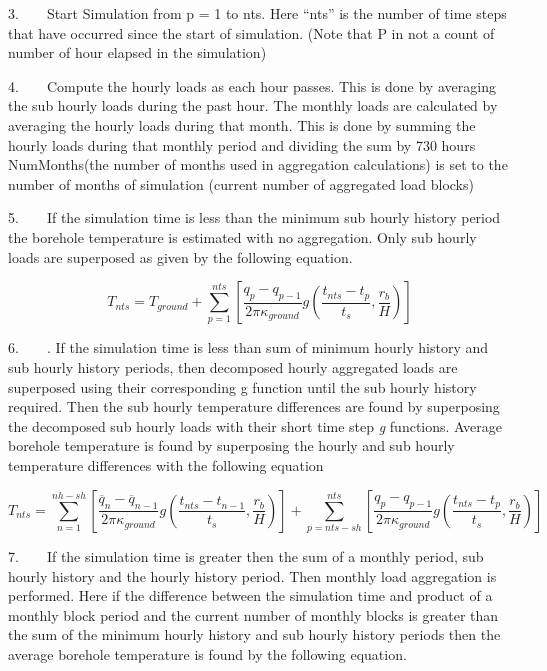 3.~~~~Start Simulation from p = 1 to nts. Here ``nts'' is the number of time steps that have occurred since the start of simulation. (Note that P in not a count of number of hour elapsed in the simulation)

4.~~~~Compute the hourly loads as each hour passes. This is done by averaging the sub hourly loads during the past hour. The monthly loads are calculated by averaging the hourly loads during that month. This is done by summing the hourly loads during that monthly period and dividing the sum by 730 hours NumMonths(the number of months used in aggregation calculations) is set to the number of months of simulation (current number of aggregated load blocks)

5.~~~~If the simulation time is less than the minimum sub hourly history period the borehole temperature is estimated with no aggregation. Only sub hourly loads are superposed as given by the following equation.

\begin{equation}
{T_{nts}} = {T_{ground}} + \sum\limits_{p = 1}^{nts} {\left[ {\frac{{{q_p} - {q_{p - 1}}}}{{2\pi {\kappa_{ground}}}}g\left( {\frac{{{t_{nts}} - {t_p}}}{{{t_s}}},\frac{{{r_b}}}{H}} \right)} \right]}
\end{equation}

6.~~~~. If the simulation time is less than sum of minimum hourly history and sub hourly history periods, then decomposed hourly aggregated loads are superposed using their corresponding g function until the sub hourly history required. Then the sub hourly temperature differences are found by superposing the decomposed sub hourly loads with their short time step \emph{g} functions. Average borehole temperature is found by superposing the hourly and sub hourly temperature differences with the following equation

\begin{equation}
{T_{nts}} = \sum\limits_{n = 1}^{nh - sh} {\left[ {\frac{{{{\overline q }_n} - {{\overline q }_{n - 1}}}}{{2\pi {\kappa_{ground}}}}g\left( {\frac{{{t_{nts}} - {t_{n - 1}}}}{{{t_s}}},\frac{{{r_b}}}{H}} \right)} \right]}  + \sum\limits_{p = nts - sh}^{nts} {\left[ {\frac{{{q_p} - {q_{p - 1}}}}{{2\pi {\kappa_{ground}}}}g\left( {\frac{{{t_{nts}} - {t_p}}}{{{t_s}}},\frac{{{r_b}}}{H}} \right)} \right]}
\end{equation}

7.~~~~If the simulation time is greater then the sum of a monthly period, sub hourly history and the hourly history period. Then monthly load aggregation is performed. Here if the difference between the simulation time and product of a monthly block period and the current number of monthly blocks is greater than the sum of the minimum hourly history and sub hourly history periods then the average borehole temperature is found by the following equation.

